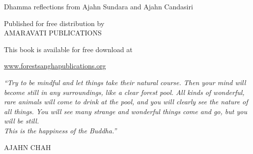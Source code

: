
{\pagestyle{empty}

{\raggedleft\setlength{\parskip}{1em}\setlength{\parindent}{0em}

\vspace*{4\baselineskip}
{\selectfont\titlepagetitlesize\color{textbody} \MakeUppercase{\bookTitle}%
\par\vspace*{\baselineskip}\vspace*{-0.1\baselineskip} {\titlepageauthorsize%
Dhamma reflections from\linebreak
Ajahn Sundara and Ajahn Candasiri%
}}

\vfill

{\selectfont%
Published for free distribution by\\
AMARAVATI PUBLICATIONS

This book is available for free download at

\vspace*{-0.8\baselineskip}%
{\titlepagelinksize\href{http://www.forestsanghapublications.org/}{www.forestsanghapublications.org}}%

}

}

\mbox{}\newpage\thispagestyle{empty}%


\cleardoublepage

\mbox{}\vspace*{-\headsep}

\noindent%
\begin{minipage}[c][\textheight][c]{\paperwidth}

\noindent\hspace*{-20mm}%
\begin{minipage}{\paperwidth}
\centering

\parbox{0.6\linewidth}{\centering\itshape%
``Try to be mindful and let things take their natural course. Then your mind will become still in any surroundings, like a clear forest pool. All kinds of wonderful, rare animals will come to drink at the pool, and you will clearly see the nature of all things. You will see many strange and wonderful things come and go, but you will be still.\\ This is the happiness of the Buddha.''}
\bigskip

{\smaller\MakeUppercase{Ajahn Chah}}

\end{minipage}


\end{minipage}}
